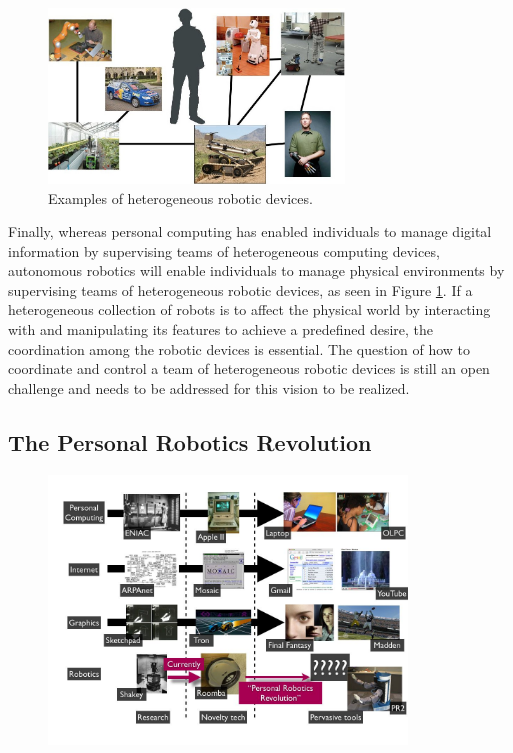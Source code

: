 \begin{figure}[!h]
\centering
\includegraphics[width=0.7\textwidth]{figures/1_robot_apps.jpg}
\caption{Examples of heterogeneous robotic devices.}
\label{fig:1_robot_apps}
\end{figure}

Finally, whereas personal computing has enabled individuals to manage digital information by supervising teams of heterogeneous computing devices, autonomous robotics will enable individuals to manage physical environments by supervising teams of heterogeneous robotic devices, as seen in Figure \ref{fig:1_robot_apps}. If a heterogeneous collection of robots is to affect the physical world by interacting with and manipulating its features to achieve a predefined desire, the coordination among the robotic devices is essential. The question of how to coordinate and control a team of heterogeneous robotic devices is still an open challenge and needs to be addressed for this vision to be realized. 

\subsection{The Personal Robotics Revolution}

\begin{figure}[!h]
\centering
\includegraphics[width=0.85\textwidth]{figures/1_revolution.jpg}
\end{figure}

